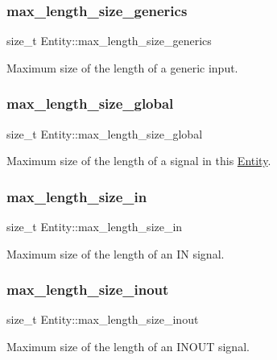 \subsubsection{\texorpdfstring{max\_length\_size\_generics}{max\_length\_size\_generics}}
{\footnotesize\ttfamily size\+\_\+t Entity\+::max\+\_\+length\+\_\+size\+\_\+generics}

Maximum size of the length of a generic input. \mbox{\label{struct_entity_a36ae5682c01accd9d4335055ab0eca05}} 
\subsubsection{\texorpdfstring{max\_length\_size\_global}{max\_length\_size\_global}}
{\footnotesize\ttfamily size\+\_\+t Entity\+::max\+\_\+length\+\_\+size\+\_\+global}

Maximum size of the length of a signal in this \mbox{\hyperlink{struct_entity}{Entity}}. \mbox{\label{struct_entity_a3dc25f084d7d9f51ec16d4154d8d7153}} 
\subsubsection{\texorpdfstring{max\_length\_size\_in}{max\_length\_size\_in}}
{\footnotesize\ttfamily size\+\_\+t Entity\+::max\+\_\+length\+\_\+size\+\_\+in}

Maximum size of the length of an IN signal. \mbox{\label{struct_entity_a0833c90ebe1f08cc102e27d9a7ee87ff}} 
\subsubsection{\texorpdfstring{max\_length\_size\_inout}{max\_length\_size\_inout}}
{\footnotesize\ttfamily size\+\_\+t Entity\+::max\+\_\+length\+\_\+size\+\_\+inout}

Maximum size of the length of an I\+N\+O\+UT signal. \mbox{\label{struct_entity_aaac43fe338ec2162eb69ee47920f3363}} 
